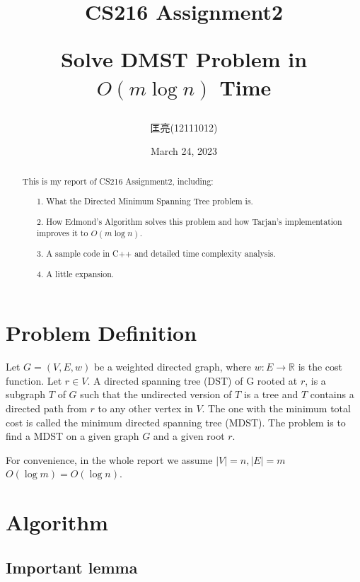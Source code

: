 \documentclass{article}
\title{CS216 Assignment2 \\ {\begin{large} Solve DMST Problem in $O(m\log n)$ Time\end{large}}}
\author{匡亮(12111012)}
\date{March 24, 2023}
\begin{document}
\maketitle

\renewcommand\abstractname{Abstract}
\begin{abstract}

This is my report of CS216 Assignment2, including:

\begin{itemize}
    \item[1.] What the Directed Minimum Spanning Tree problem is.
    \item[2.] How Edmond's Algorithm solves this problem and how Tarjan's implementation improves it to $O(m\log n)$.
    \item[3.] A sample code in C++ and detailed time complexity analysis.
    \item[4.] A little expansion.
\end{itemize}

\end{abstract}

\newpage

\renewcommand\contentsname{Contents}
\tableofcontents

\newpage

\section{Problem Definition}

Let $G=(V,E,w)$ be a weighted directed graph, where $w:E\to\mathbb{R}$ is the cost function. Let $r\in V$. A directed spanning tree (DST) of G rooted at $r$, is a subgraph $T$ of $G$ such that the undirected version of $T$ is a tree and $T$ contains a directed path from $r$ to any other vertex in $V$. The one with the minimum total cost is called the minimum directed spanning tree (MDST). The problem is to find a MDST on a given graph $G$ and a given root $r$.

For convenience, in the whole report we assume $|V|=n,|E|=m$ $O(\log m)=O(\log n)$.

\section{Algorithm}

\subsection{Important lemma}
\end{document}
